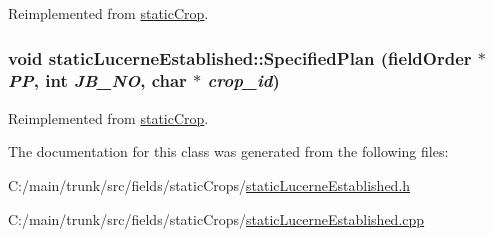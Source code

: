 Reimplemented from \hyperlink{classstatic_crop_a4d3d767f569f48eb68ffa76822302467}{staticCrop}.\hypertarget{classstatic_lucerne_established_adf4e2439ff973bd63859965a8fb64d77}{
\subsubsection[{SpecifiedPlan}]{\setlength{\rightskip}{0pt plus 5cm}void staticLucerneEstablished::SpecifiedPlan ({\bf fieldOrder} $\ast$ {\em PP}, \/  int {\em JB\_\-NO}, \/  char $\ast$ {\em crop\_\-id})}}
\label{classstatic_lucerne_established_adf4e2439ff973bd63859965a8fb64d77}


Reimplemented from \hyperlink{classstatic_crop_af19d8a1e4f4833325f6712c22ede8b45}{staticCrop}.

The documentation for this class was generated from the following files:\begin{DoxyCompactItemize}
\item 
C:/main/trunk/src/fields/staticCrops/\hyperlink{static_lucerne_established_8h}{staticLucerneEstablished.h}\item 
C:/main/trunk/src/fields/staticCrops/\hyperlink{static_lucerne_established_8cpp}{staticLucerneEstablished.cpp}\end{DoxyCompactItemize}
